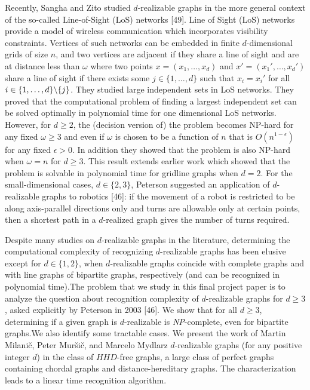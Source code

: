\documentclass[12pt,a4paper,titlepage,openany]{report}
\begin{document}
Recently, Sangha and Zito studied $d$-realizable graphs in the more general context of the so-called Line-of-Sight (LoS) networks [49]. Line of Sight (LoS) networks provide a model of wireless communication which incorporates visibility constraints. Vertices of such networks can be embedded in finite $d$-dimensional grids of size $n$, and two vertices are adjacent if they share a line of sight and are at distance less than $\omega$ where two points $x=(x_1, \ldots,x_d)$ and $x'=(x_1',\ldots ,x_d')$ share a line of sight if there exists some $j\in \{1,\ldots,d\}$ such that $x_i=x_i'$ for all $i\in \{1,\ldots,d\} \symbol{92} \{j\}$. They studied large independent sets in LoS networks. They proved that the computational problem of finding a largest independent set can be solved optimally in polynomial time for one dimensional LoS networks. However, for $d \geq 2$, the (decision version of) the problem becomes NP-hard for any fixed $\omega \geq 3$ and even if $ω$ is chosen to be a
function of $n$ that is $O(n^{1-\epsilon})$ for any fixed $\epsilon>0$. In addition they showed that the problem is also NP-hard when $\omega = n$ for $d \geq 3$. This result
extends earlier work which showed that the problem is solvable in polynomial time for gridline graphs when $d = 2$.\newline
For the small-dimensional cases, $d \in \{2, 3\}$, Peterson suggested an application of $d$-realizable graphs to robotics [46]: if the movement of a robot is restricted to be along axis-parallel directions only and turns are
allowable only at certain points, then a shortest path in a $d$-realized graph gives the number of turns required.



Despite many studies on $d$-realizable graphs in the literature, determining the computational complexity of recognizing $d$-realizable graphs has been elusive except for $d \in \{1, 2\}$,
when $d$-realizable graphs coincide with complete graphs and with line graphs of bipartite graphs, respectively (and can be recognized in polynomial time).The problem that we study in this final project paper is to analyze the question about recognition complexity of $d$-realizable graphs for $d \geq 3$, asked explicitly by Peterson in 2003 [46].
We show that for all $d \geq 3$, determining if a given graph is $d$-realizable is {\it NP}-complete, even for bipartite graphs.We also identify some tractable cases.
We present the work of Martin Milani\v c, Peter Mur\v si\v c, and Marcelo Mydlarz $d$-realizable graphs (for any positive integer $d$) in the class of $HHD$-free graphs, a large class of perfect graphs containing chordal graphs and distance-hereditary graphs. The characterization leads to a linear time recognition algorithm.\newline
\end{document}
